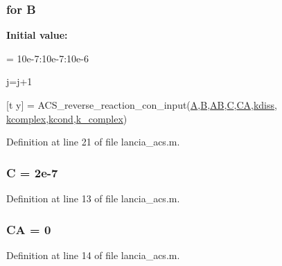 \hypertarget{a00111_afb39b9efa52a33745c5e622fa358a97f}{
\subsubsection[{B}]{\setlength{\rightskip}{0pt plus 5cm}for B}}\label{a00111_afb39b9efa52a33745c5e622fa358a97f}
{\bfseries Initial value\+:}
\begin{DoxyCode}
= 10e-7:10e-7:10e-6
        
        j=j+1
        
        
        [t y] = ACS\_reverse\_reaction\_con\_input(\hyperlink{a00111_ab4f8a2431d9ad6efec44b47971737c52}{A},\hyperlink{a00111_afb39b9efa52a33745c5e622fa358a97f}{B},\hyperlink{a00111_abfef5bcdab19147dbfbb68112da17044}{AB},\hyperlink{a00111_aaa53ca0b650dfd85c4f59fa156f7a2cc}{C},\hyperlink{a00111_afb377083e62f3bde1716905353335a78}{CA},\hyperlink{a00111_aa3a014475bd24120996191acceaa4f3d}{kdiss},
      \hyperlink{a00111_a9cf172af920b969c5411ac19e5e13e22}{kcomplex},\hyperlink{a00111_af49f64b0687f4e269a7dc8e56ca82772}{kcond},\hyperlink{a00111_ad821064ff58d369f2a880dc5bf3db527}{k\_complex})
\end{DoxyCode}


Definition at line 21 of file lancia\+\_\+acs.\+m.

\hypertarget{a00111_aaa53ca0b650dfd85c4f59fa156f7a2cc}{
\subsubsection[{C}]{\setlength{\rightskip}{0pt plus 5cm}C = 2e-\/7}}\label{a00111_aaa53ca0b650dfd85c4f59fa156f7a2cc}


Definition at line 13 of file lancia\+\_\+acs.\+m.

\hypertarget{a00111_afb377083e62f3bde1716905353335a78}{
\subsubsection[{C\+A}]{\setlength{\rightskip}{0pt plus 5cm}C\+A = 0}}\label{a00111_afb377083e62f3bde1716905353335a78}


Definition at line 14 of file lancia\+\_\+acs.\+m.

